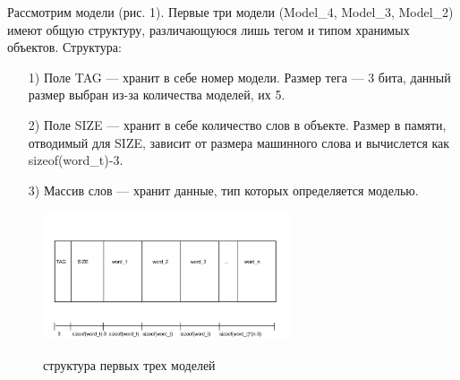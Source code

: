 \documentclass[12pt,a4paper]{article}
\begin{document}
Рассмотрим модели (рис. 1). Первые три модели (Model\_4, Model\_3, Model\_2) имеют общую структуру, различающуюся лишь тегом и типом хранимых объектов.
Структура:
\begin{enumerate}
\item[1)] Поле TAG — хранит в себе номер модели. Размер тега — 3 бита, данный размер выбран из-за количества моделей, их 5.
\item[2)] Поле SIZE — хранит в себе количество слов в объекте. Размер в памяти, отводимый для SIZE, зависит от размера машинного слова и вычислется как sizeof(word\_t)-3.
\item[3)] Массив слов — хранит данные, тип которых определяется моделью.
\end{enumerate}

\begin{figure}[h]
\includegraphics[width=0.65\textwidth]{1}\\
\caption{структура первых трех моделей}
\end{figure}
\end{document}
